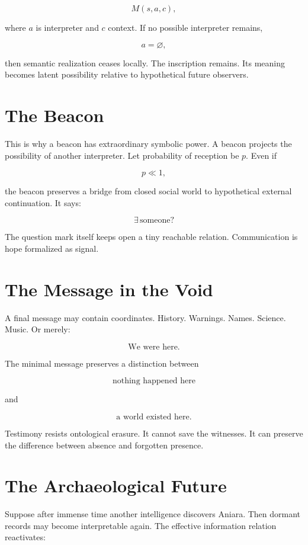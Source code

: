 \documentclass[11pt,oneside]{book}
\theoremstyle{definition}
\theoremstyle{remark}
\begin{document}
\[
M(s,a,c),
\]

where \(a\) is interpreter and \(c\) context. If no possible interpreter remains,

\[
a=\varnothing,
\]

then semantic realization ceases locally. The inscription remains. Its meaning becomes latent
possibility relative to hypothetical future observers.

\section{The Beacon}

This is why a beacon has extraordinary symbolic power. A beacon projects the possibility of another
interpreter. Let probability of reception be \(p\). Even if

\[
p\ll1,
\]

the beacon preserves a bridge from closed social world to hypothetical external continuation. It
says:

\[
\exists\,\text{someone?}
\]

The question mark itself keeps open a tiny reachable relation. Communication is hope formalized as
signal.

\section{The Message in the Void}

A final message may contain coordinates. History. Warnings. Names. Science. Music. Or merely:

\[
\text{We were here.}
\]

The minimal message preserves a distinction between

\[
\text{nothing happened here}
\]

and

\[
\text{a world existed here}.
\]

Testimony resists ontological erasure. It cannot save the witnesses. It can preserve the difference
between absence and forgotten presence.

\section{The Archaeological Future}

Suppose after immense time another intelligence discovers Aniara. Then dormant records may become
interpretable again. The effective information relation reactivates:
\end{document}
